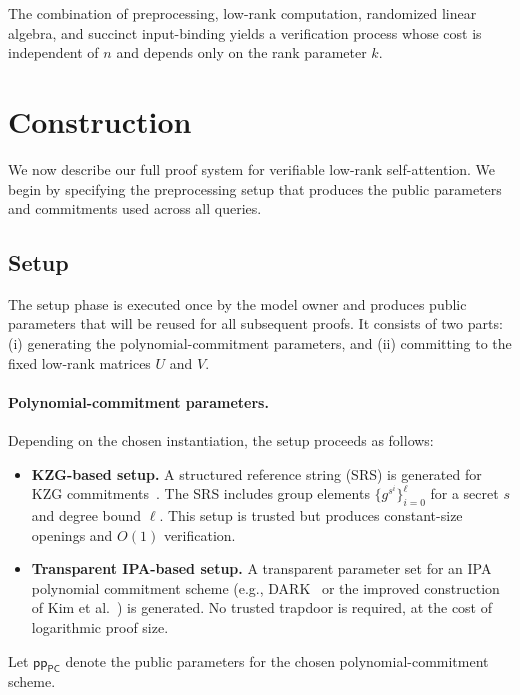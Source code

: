 \documentclass[11pt]{article}
\begin{document}
The combination of preprocessing, low-rank computation, randomized
linear algebra, and succinct input-binding yields a verification process
whose cost is independent of $n$ and depends only on the rank parameter
$k$.

\section{Construction}

We now describe our full proof system for verifiable low-rank
self-attention.  We begin by specifying the preprocessing setup that
produces the public parameters and commitments used across all
queries.

\subsection{Setup}

The setup phase is executed once by the model owner and produces
public parameters that will be reused for all subsequent proofs.
It consists of two parts:
(i) generating the polynomial-commitment parameters, and
(ii) committing to the fixed low-rank matrices $U$ and $V$.

\paragraph{Polynomial-commitment parameters.}
Depending on the chosen instantiation, the setup proceeds as follows:

\begin{itemize}
  \item \textbf{KZG-based setup.}
  A structured reference string (SRS) is generated for KZG
  commitments~\cite{kate2010polynomial}.
  The SRS includes group elements
  $\{g^{s^i}\}_{i=0}^{\ell}$ for a secret $s$ and degree bound $\ell$.
  This setup is trusted but produces constant-size openings 
  and $O(1)$ verification.

  \item \textbf{Transparent IPA-based setup.}
  A transparent parameter set for an IPA polynomial commitment scheme
  (e.g., DARK~\cite{bunz2019dark} or the improved construction of
  Kim et al.~\cite{kim2023etpc}) is generated.
  No trusted trapdoor is required, at the cost of logarithmic proof size.
\end{itemize}

Let $\mathsf{pp}_{\mathsf{PC}}$ denote the public parameters for the 
chosen polynomial-commitment scheme.
\end{document}
